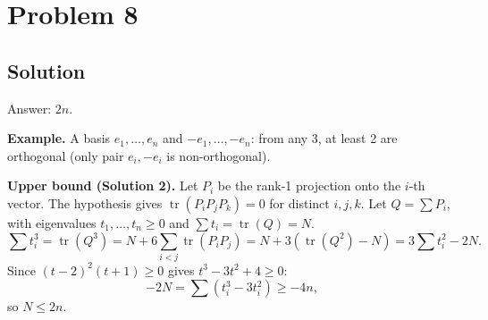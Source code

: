 \documentclass{article}
\begin{document}
\section*{Problem 8}
\subsection*{Solution}
Answer: $2n$.

\textbf{Example.} A basis $e_1, \ldots, e_n$ and $-e_1, \ldots, -e_n$: from any 3, at least 2 are orthogonal (only pair $e_i, -e_i$ is non-orthogonal).

\textbf{Upper bound (Solution 2).} Let $P_i$ be the rank-1 projection onto the $i$-th vector. The hypothesis gives $\operatorname{tr}(P_i P_j P_k) = 0$ for distinct $i, j, k$. Let $Q = \sum P_i$, with eigenvalues $t_1, \ldots, t_n \geq 0$ and $\sum t_i = \operatorname{tr}(Q) = N$.
\[ \sum t_i^3 = \operatorname{tr}(Q^3) = N + 6 \sum_{i<j} \operatorname{tr}(P_i P_j) = N + 3(\operatorname{tr}(Q^2) - N) = 3 \sum t_i^2 - 2N. \]
Since $(t-2)^2(t+1) \geq 0$ gives $t^3 - 3t^2 + 4 \geq 0$:
\[ -2N = \sum (t_i^3 - 3 t_i^2) \geq -4n, \]
so $N \leq 2n$.
\end{document}

